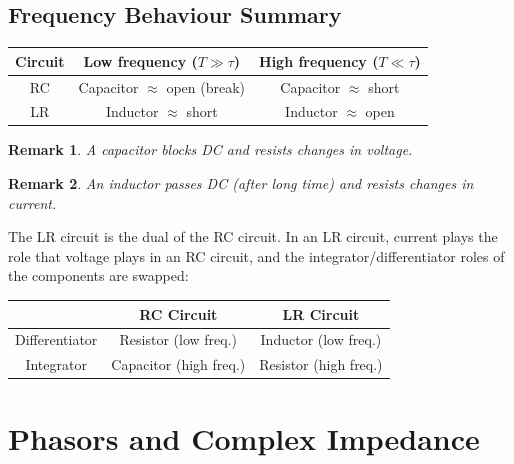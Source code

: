 \documentclass{article}
\newtheorem{remark}{Remark}
\begin{document}
\subsection{Frequency Behaviour Summary}
\begin{center}
    \begin{tabular}{|c|c|c|}
    \hline
    Circuit & Low frequency ($T \gg \tau$) & High frequency ($T \ll \tau$) \\
    \hline
    RC & Capacitor $\approx$ open (break) & Capacitor $\approx$ short \\
    \hline
    LR & Inductor $\approx$ short  & Inductor $\approx$ open  \\
    \hline
    \end{tabular}
\end{center}
\begin{remark}
    A capacitor blocks DC and resists changes in voltage.
\end{remark}
\begin{remark}
    An inductor passes DC (after long time) and resists changes in current.
\end{remark}
The LR circuit is the dual of the RC circuit. In an LR circuit, current plays the role that voltage plays in an RC circuit, and the integrator/differentiator roles of the components are swapped:
\begin{center}
    \begin{tabular}{|c|c|c|}
    \hline
    & RC Circuit & LR Circuit \\
    \hline
    Differentiator & Resistor (low freq.) & Inductor (low freq.) \\
    \hline
    Integrator & Capacitor (high freq.) & Resistor (high freq.) \\
    \hline
    \end{tabular}
\end{center}

\section{Phasors and Complex Impedance}
\end{document}
